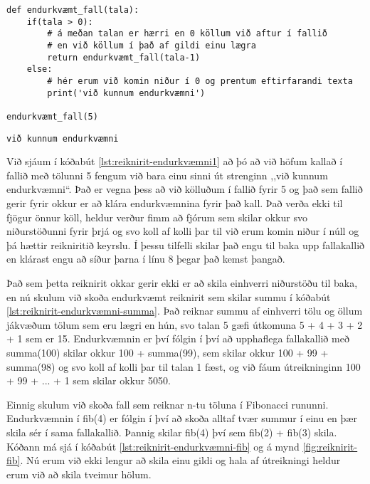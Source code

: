 \begin{lstlisting}[caption=Endurkvæmni - einfalt, label=lst:reiknirit-endurkvæmni1]
def endurkvæmt_fall(tala):
	if(tala > 0):
		# á meðan talan er hærri en 0 köllum við aftur í fallið
		# en við köllum í það af gildi einu lægra
		return endurkvæmt_fall(tala-1)
	else:
		# hér erum við komin niður í 0 og prentum eftirfarandi texta
		print('við kunnum endurkvæmni')
		
endurkvæmt_fall(5)
\end{lstlisting}
\lstset{style=uttak}
\begin{lstlisting}
við kunnum endurkvæmni
\end{lstlisting}
\lstset{style=venjulegt}

Við sjáum í kóðabút \ref{lst:reiknirit-endurkvæmni1} að þó að við höfum kallað í fallið með tölunni 5 fengum við bara einu sinni út strenginn ,,við kunnum endurkvæmni“.
Það er vegna þess að við kölluðum í fallið fyrir 5 og það sem fallið gerir fyrir okkur er að klára endurkvæmnina fyrir það kall.
Það verða ekki til fjögur önnur köll, heldur verður fimm að fjórum sem skilar okkur svo niðurstöðunni fyrir þrjá og svo koll af kolli þar til við erum komin niður í núll og þá hættir reikniritið keyrslu.
Í þessu tilfelli skilar það engu til baka upp fallakallið en klárast engu að síður þarna í línu 8 þegar það kemst þangað.


Það sem þetta reiknirit okkar gerir ekki er að skila einhverri niðurstöðu til baka, en nú skulum við skoða endurkvæmt reiknirit sem skilar summu í kóðabút \ref{lst:reiknirit-endurkvæmni-summa}.
Það reiknar summu af einhverri tölu og öllum jákvæðum tölum sem eru lægri en hún, svo talan 5 gæfi útkomuna 5 + 4 + 3 + 2 + 1 sem er 15.
Endurkvæmnin er því fólgin í því að upphaflega fallakallið með summa(100) skilar okkur 100 + summa(99), sem skilar okkur 100 + 99 + summa(98) og svo koll af kolli þar til talan 1 fæst, og við fáum útreikninginn 100 + 99 + ... + 1 sem skilar okkur 5050.

Einnig skulum við skoða fall sem reiknar n-tu töluna í Fibonacci rununni.
Endurkvæmnin í fib(4) er fólgin í því að skoða alltaf tvær summur í einu en þær skila sér í sama fallakallið.
Þannig skilar fib(4) því sem fib(2) + fib(3) skila.
Kóðann má sjá í kóðabút \ref{lst:reiknirit-endurkvæmni-fib} og á mynd \ref{fig:reiknirit-fib}.
Nú erum við ekki lengur að skila einu gildi og hala af útreikningi heldur erum við að skila tveimur hölum.

